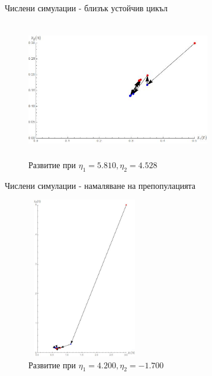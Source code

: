 
\captionsetup[figure]{labelformat=empty}

\begin{frame}[t]{Числени симулации - близък устойчив цикъл}

\begin{center}
\begin{figure}[htp]
\includegraphics[width=8cm,height=6cm]{migrationSimulation1}
\caption{Развитие при $\eta_{1}=5.810, \eta_{2}=4.528$}
\end{figure}
\end{center}

\end{frame}

\begin{frame}[t]{Числени симулации - намаляване на препопулацията}

\begin{center}
\begin{figure}[htp]
\includegraphics[width=5cm,height=7cm]
{migrationSimulation2}
\caption{Развитие при $\eta_{1}=4.200, \eta_{2}=-1.700$}
\end{figure}
\end{center}

\end{frame}


